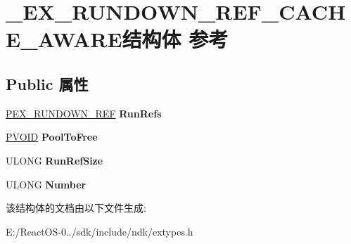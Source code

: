 \hypertarget{struct___e_x___r_u_n_d_o_w_n___r_e_f___c_a_c_h_e___a_w_a_r_e}{}\section{\+\_\+\+E\+X\+\_\+\+R\+U\+N\+D\+O\+W\+N\+\_\+\+R\+E\+F\+\_\+\+C\+A\+C\+H\+E\+\_\+\+A\+W\+A\+R\+E结构体 参考}
\label{struct___e_x___r_u_n_d_o_w_n___r_e_f___c_a_c_h_e___a_w_a_r_e}
\subsection*{Public 属性}
\begin{DoxyCompactItemize}
\item 
\mbox{\label{struct___e_x___r_u_n_d_o_w_n___r_e_f___c_a_c_h_e___a_w_a_r_e_abaa3500875f4b6c9a600c9bc55548595}} 
\hyperlink{struct___e_x___r_u_n_d_o_w_n___r_e_f}{P\+E\+X\+\_\+\+R\+U\+N\+D\+O\+W\+N\+\_\+\+R\+EF} {\bfseries Run\+Refs}
\item 
\mbox{\label{struct___e_x___r_u_n_d_o_w_n___r_e_f___c_a_c_h_e___a_w_a_r_e_a2cb2e3ad5ed922e353e74bf0edb772f9}} 
\hyperlink{interfacevoid}{P\+V\+O\+ID} {\bfseries Pool\+To\+Free}
\item 
\mbox{\label{struct___e_x___r_u_n_d_o_w_n___r_e_f___c_a_c_h_e___a_w_a_r_e_a1f99d0f2d7cc1f29b4f6391ecf48b174}} 
U\+L\+O\+NG {\bfseries Run\+Ref\+Size}
\item 
\mbox{\label{struct___e_x___r_u_n_d_o_w_n___r_e_f___c_a_c_h_e___a_w_a_r_e_af7a495ffae49c114fab625bfef748213}} 
U\+L\+O\+NG {\bfseries Number}
\end{DoxyCompactItemize}


该结构体的文档由以下文件生成\+:\begin{DoxyCompactItemize}
\item 
E\+:/\+React\+O\+S-\/0../sdk/include/ndk/extypes.\+h\end{DoxyCompactItemize}
